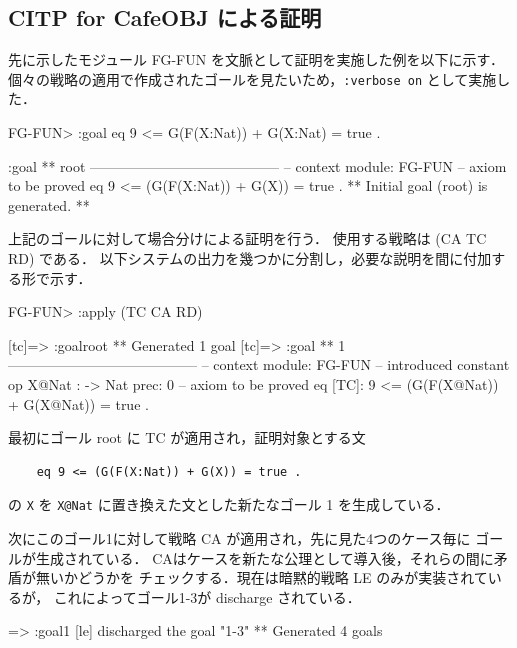 \documentclass[a4paper,oneside,10pt,here]{memoir}
\newenvironment{vvtm}%
{\parskip=0pt\lineskip=0pt\begin{center}\begin{minipage}{0.8\textwidth}\begin{snugshade}}%
  {\end{snugshade}\end{minipage}\end{center}}
\begin{document}
\subsection{CITP for CafeOBJ による証明}

先に示したモジュール FG-FUN を文脈として証明を実施した例を以下に示す．
個々の戦略の適用で作成されたゴールを見たいため，\verb|:verbose on| として実施した．

\begin{vvtm}
  \begin{simplev}
FG-FUN> :goal { eq 9 <= G(F(X:Nat)) + G(X:Nat) = true . }

:goal { ** root -----------------------------------------
  -- context module: FG-FUN
  -- axiom to be proved
    eq 9 <= (G(F(X:Nat)) + G(X)) = true .
}
** Initial goal (root) is generated. **
  \end{simplev}
\end{vvtm}

上記のゴールに対して場合分けによる証明を行う．
使用する戦略は (CA TC RD) である．
以下システムの出力を幾つかに分割し，必要な説明を間に付加する形で示す．

\begin{vvtm}
  \begin{simplev}
FG-FUN> :apply (TC CA RD)

[tc]=> :goal{root}
** Generated 1 goal
[tc]=>
:goal { ** 1 -----------------------------------------
  -- context module: FG-FUN
  -- introduced constant
    op X@Nat : -> Nat { prec: 0 }
  -- axiom to be proved
    eq [TC]: 9 <= (G(F(X@Nat)) + G(X@Nat))
        = true .
}
\end{simplev}
\end{vvtm}
最初にゴール root に TC が適用され，証明対象とする文
\begin{verbatim}
    eq 9 <= (G(F(X:Nat)) + G(X)) = true .
\end{verbatim}
の \texttt{X} を \verb|X@Nat| に置き換えた文とした新たなゴール 1 を生成している．

次にこのゴール1に対して戦略 CA が適用され，先に見た4つのケース毎に
ゴールが生成されている．
CAはケースを新たな公理として導入後，それらの間に矛盾が無いかどうかを
チェックする．現在は暗黙的戦略 LE のみが実装されているが，
これによってゴール1-3が discharge されている．

\begin{vvtm}
\begin{simplev}
[ca]=> :goal{1}
[le] discharged the goal "1-3"
** Generated 4 goals
\end{simplev}
\end{vvtm}
\end{document}
